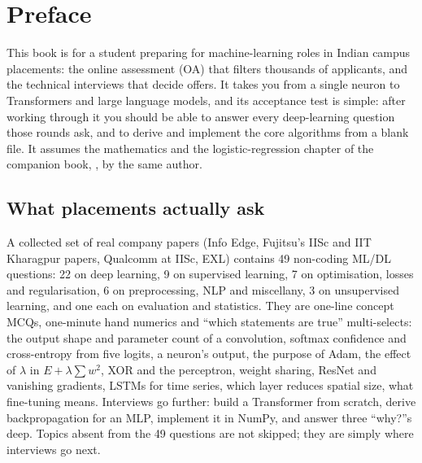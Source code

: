 \chapter*{Preface}

This book is for a student preparing for machine-learning roles in Indian campus placements: the
online assessment (OA) that filters thousands of applicants, and the technical interviews that
decide offers. It takes you from a single neuron to Transformers and large language models, and
its acceptance test is simple: after working through it you should be able to answer every
deep-learning question those rounds ask, and to derive and implement the core algorithms from a
blank file. It assumes the mathematics and the logistic-regression chapter of the companion book,
, by the same author.

\section*{What placements actually ask}
A collected set of real company papers (Info Edge, Fujitsu's IISc and IIT Kharagpur papers,
Qualcomm at IISc, EXL) contains 49 non-coding ML/DL questions: 22 on deep learning, 9 on supervised
learning, 7 on optimisation, losses and regularisation, 6 on preprocessing, NLP and miscellany,
3 on unsupervised learning, and one each on evaluation and statistics. They are one-line concept
MCQs, one-minute hand numerics and ``which statements are true'' multi-selects: the output shape and
parameter count of a convolution, softmax confidence and cross-entropy from five logits, a neuron's
output, the purpose of Adam, the effect of $\lambda$ in $E+\lambda\sum w^2$, XOR and the perceptron,
weight sharing, ResNet and vanishing gradients, LSTMs for time series, which layer reduces spatial
size, what fine-tuning means. Interviews go further: build a Transformer from scratch, derive
backpropagation for an MLP, implement it in NumPy, and answer three ``why?''s deep. Topics absent
from the 49 questions are not skipped; they are simply where interviews go next.

